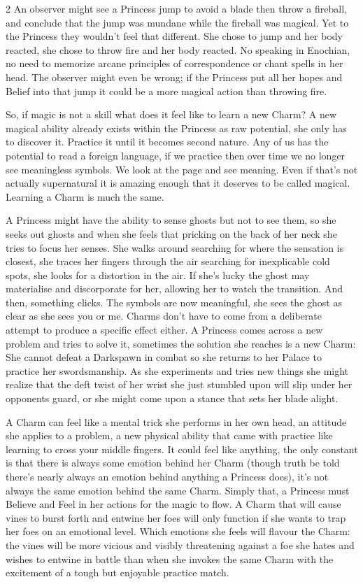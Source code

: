 \begin{multicols}{2}
An observer might see a Princess jump to avoid a blade then throw a fireball, and conclude that the jump was mundane while the fireball was magical. Yet to the Princess they wouldn't feel that different. She chose to jump and her body reacted, she chose to throw fire and her body reacted. No speaking in Enochian, no need to memorize arcane principles of correspondence or chant spells in her head. The observer might even be wrong; if the Princess put all her hopes and Belief into that jump it could be a more magical action than throwing fire.

So, if magic is not a skill what does it feel like to learn a new Charm? A new magical ability already exists within the Princess as raw potential, she only has to discover it. Practice it until it becomes second nature. Any of us has the potential to read a foreign language, if we practice then over time we no longer see meaningless symbols. We look at the page and see meaning. Even if that's not actually supernatural it is amazing enough that it deserves to be called magical. Learning a Charm is much the same.

A Princess might have the ability to sense ghosts but not to see them, so she seeks out ghosts and when she feels that pricking on the back of her neck she tries to focus her senses. She walks around searching for where the sensation is closest, she traces her fingers through the air searching for inexplicable cold spots, she looks for a distortion in the air. If she's lucky the ghost may materialise and discorporate for her, allowing her to watch the transition. And then, something clicks. The symbols are now meaningful, she sees the ghost as clear as she sees you or me. Charms don't have to come from a deliberate attempt to produce a specific effect either. A Princess comes across a new problem and tries to solve it, sometimes the solution she reaches is a new Charm: She cannot defeat a Darkspawn in combat so she returns to her Palace to practice her swordsmanship. As she experiments and tries new things she might realize that the deft twist of her wrist she just stumbled upon will slip under her opponents guard, or she might come upon a stance that sets her blade alight.

A Charm can feel like a mental trick she performs in her own head, an attitude she applies to a problem, a new physical ability that came with practice like learning to cross your middle fingers. It could feel like anything, the only constant is that there is always some emotion behind her Charm (though truth be told there's nearly always an emotion behind anything a Princess does), it's not always the same emotion behind the same Charm. Simply that, a Princess must Believe and Feel in her actions for the magic to flow. A Charm that will cause vines to burst forth and entwine her foes will only function if she wants to trap her foes on an emotional level. Which emotions she feels will flavour the Charm: the vines will be more vicious and visibly threatening against a foe she hates and wishes to entwine in battle than when she invokes the same Charm with the excitement of a tough but enjoyable practice match.


\end{multicols}
